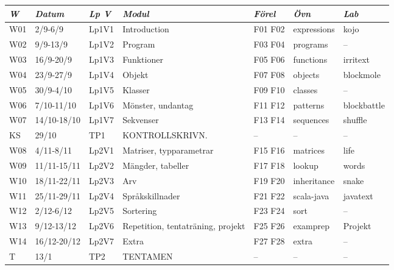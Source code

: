 \begin{tabular}{l|l|l|l|l|l|l}
\textit{W} & \textit{Datum} & \textit{Lp V} & \textit{Modul} & \textit{Förel} & \textit{Övn} & \textit{Lab} \\ \hline \hline
W01 & 2/9-6/9 & Lp1V1 & Introduction & F01 F02 & expressions & kojo \\
W02 & 9/9-13/9 & Lp1V2 & Program & F03 F04 & programs & -- \\
W03 & 16/9-20/9 & Lp1V3 & Funktioner & F05 F06 & functions & irritext \\
W04 & 23/9-27/9 & Lp1V4 & Objekt & F07 F08 & objects & blockmole \\
W05 & 30/9-4/10 & Lp1V5 & Klasser & F09 F10 & classes & -- \\
W06 & 7/10-11/10 & Lp1V6 & Mönster, undantag & F11 F12 & patterns & blockbattle \\
W07 & 14/10-18/10 & Lp1V7 & Sekvenser & F13 F14 & sequences & shuffle \\
KS & 29/10 & TP1 & KONTROLLSKRIVN. & -- & -- & -- \\
W08 & 4/11-8/11 & Lp2V1 & Matriser, typparametrar & F15 F16 & matrices & life \\
W09 & 11/11-15/11 & Lp2V2 & Mängder, tabeller & F17 F18 & lookup & words \\
W10 & 18/11-22/11 & Lp2V3 & Arv & F19 F20 & inheritance & snake \\
W11 & 25/11-29/11 & Lp2V4 & Språkskillnader & F21 F22 & scala-java & javatext \\
W12 & 2/12-6/12 & Lp2V5 & Sortering & F23 F24 & sort & -- \\
W13 & 9/12-13/12 & Lp2V6 & Repetition, tentaträning, projekt & F25 F26 & examprep & Projekt \\
W14 & 16/12-20/12 & Lp2V7 & Extra & F27 F28 & extra & -- \\
T & 13/1 & TP2 & TENTAMEN & -- & -- & -- \\
\end{tabular}

